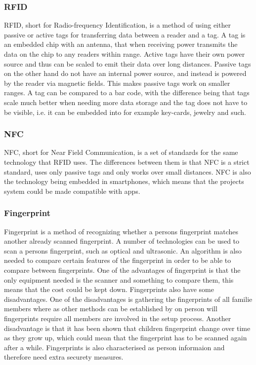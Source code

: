 \subsubsection{RFID}
RFID,  short for Radio-frequency Identification, is a method of using either passive or active tags for transferring data between a reader and a tag. A tag is an embedded chip with an antenna, that when receiving power transmits the data on the chip to any readers within range. Active tags have their own power source and thus can be scaled to emit their data over long distances. Passive tags on the other hand do not have an internal power source, and instead is powered by the reader via magnetic fields. This makes passive tags work on smaller ranges. A tag can be compared to a bar code, with the difference being that tags scale much better when needing more data storage and the tag does not have to be visible, i.e. it can be embedded into for example key-cards, jewelry and such.

\subsubsection{NFC}
NFC, short for Near Field Communication, is a set of standards for the same technology that RFID uses. The differences between them is that NFC is a strict standard, uses only passive tags and only works over small distances. NFC is also the technology being embedded in smartphones, which means that the projects system could be made compatible with apps.

\subsubsection{Fingerprint}
Fingerprint is a method of recognizing whether a persons fingerprint matches another already scanned fingerprint. A number of technologies can be used to scan a persons fingerprint, such as optical and ultrasonic. An algorithm is also needed to compare certain features of the fingerprint in order to be able to compare between fingerprints. One of the advantages of fingerprint is that the only equipment needed is the scanner and something to compare them, this means that the cost could be kept down. Fingerprints also have some disadvantages. One of the disadvantages is gathering the fingerprints of all familie members where as other methods can be established by on person will fingerprints require all members are involved in the setup process. Another disadvantage is that it has been shown that children fingerprint change over time as they grow up, which could mean that the fingerprint has to be scanned again after a while. Fingerprints is also characterised as person informaion and therefore need extra securety measures. 

